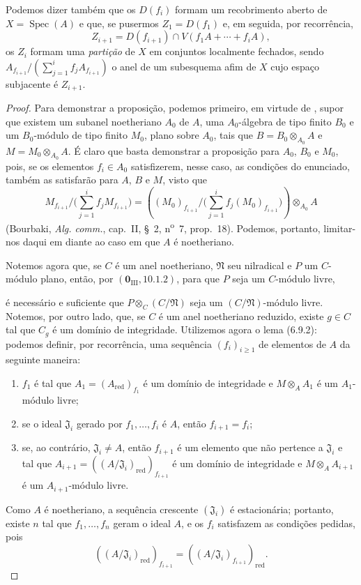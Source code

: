 Podemos dizer também que os $D(f_i)$
formam um recobrimento aberto de
$X=\operatorname{Spec}(A)$ e que, se
pusermos $Z_1=D(f_1)$ e, em seguida,
por recorrência,
\[
Z_{i+1}=D(f_{i+1})\cap
V(f_1A+\cdots+f_iA),
\]
os $Z_i$ formam uma \emph{partição}
de $X$ em conjuntos localmente
fechados, sendo
$A_{f_{i+1}}/
(\sum_{j=1}^{i}f_jA_{f_{i+1}})$
o anel de um subesquema afim de
$X$ cujo espaço subjacente é
$Z_{i+1}$.

\begin{proof}
Para demonstrar a proposição, podemos
primeiro, em virtude de
, supor que existem
um subanel noetheriano $A_0$ de $A$,
uma $A_0$-álgebra de tipo finito $B_0$
e um $B_0$-módulo de tipo finito $M_0$,
plano sobre $A_0$, tais que
$B=B_0\otimes_{A_0}A$ e
$M=M_0\otimes_{A_0}A$. É claro que
basta demonstrar a proposição para
$A_0$, $B_0$ e $M_0$, pois, se os
elementos $f_i\in A_0$ satisfizerem,
nesse caso, as condições do enunciado,
também as satisfarão para $A$, $B$ e
$M$, visto que
\[
M_{f_{i+1}}\Big/
\Big(\sum_{j=1}^{i}f_jM_{f_{i+1}}\Big)
=\left((M_0)_{f_{i+1}}\Big/
\Big(\sum_{j=1}^{i}
f_j(M_0)_{f_{i+1}}\Big)\right)
\otimes_{A_0}A
\]
(Bourbaki, \emph{Alg. comm.}, cap.~II,
\S~2, n\textsuperscript{o}~7,
prop.~18). Podemos, portanto,
limitar-nos daqui em diante ao caso
em que $A$ é noetheriano.

Notemos agora que, se $C$ é um anel
noetheriano, $\mathfrak N$ seu
nilradical e $P$ um $C$-módulo
plano, então, por
$(\mathbf 0_{\mathrm{III}},10.1.2)$,
para que $P$ seja um $C$-módulo livre,


é necessário e suficiente que
$P\otimes_C(C/\mathfrak N)$ seja um
$(C/\mathfrak N)$-módulo livre.
Notemos, por outro lado, que, se
$C$ é um anel noetheriano reduzido,
existe $g\in C$ tal que $C_g$ é
um domínio de integridade. Utilizemos agora
o lema (6.9.2): podemos definir,
por recorrência, uma sequência
$(f_i)_{i\geq1}$ de elementos de
$A$ da seguinte maneira:
\begin{enumerate}
\item[$1^\circ$] $f_1$ é tal que
$A_1=(A_{\mathrm{red}})_{f_1}$
é um domínio de integridade e $M\otimes_A A_1$
é um $A_1$-módulo livre;
\item[$2^\circ$] se o ideal
$\mathfrak J_i$ gerado por
$f_1,\ldots,f_i$ é $A$, então
$f_{i+1}=f_i$;
\item[$3^\circ$] se, ao contrário,
$\mathfrak J_i\neq A$, então
$f_{i+1}$ é um elemento que não
pertence a $\mathfrak J_i$ e tal que
$A_{i+1}=
((A/\mathfrak J_i)_{\mathrm{red}})
_{f_{i+1}}$ é um domínio de integridade e
$M\otimes_A A_{i+1}$ é um
$A_{i+1}$-módulo livre.
\end{enumerate}
Como $A$ é noetheriano, a sequência
crescente $(\mathfrak J_i)$ é
estacionária; portanto, existe $n$
tal que $f_1,\ldots,f_n$ geram o
ideal $A$, e os $f_i$ satisfazem as
condições pedidas, pois
\[
((A/\mathfrak J_i)_{\mathrm{red}})
_{f_{i+1}}
=((A/\mathfrak J_i)_{f_{i+1}})
_{\mathrm{red}}.
\]
\end{proof}

